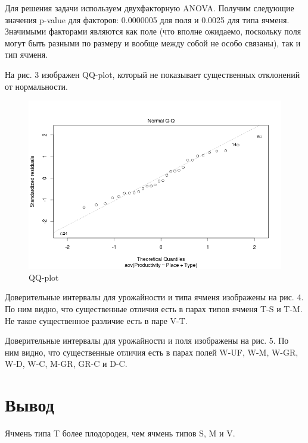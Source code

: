\documentclass[10pt]{article}
\begin{document}
Для решения задачи используем двухфакторную ANOVA.
Получим следующие значения p-value для факторов: 0.0000005 для поля и 0.0025 для типа ячменя.
Значимыми факторами являются как поле (что вполне ожидаемо, поскольку поля могут быть разными по размеру и вообще между собой не особо связаны), так и тип ячменя.

На рис. 3 изображен QQ-plot, который не показывает существенных отклонений от нормальности.

\begin{figure}[h]
  \centering
  \includegraphics[scale=0.4]{qqplot.png}
  \caption{QQ-plot}
\end{figure}

Доверительные интервалы для урожайности и типа ячменя изображены на рис. 4.
По ним видно, что существенные отличия есть в парах типов ячменя T-S и T-M.
Не такое существенное различие есть в паре V-T.

Доверительные интервалы для урожайности и поля изображены на рис. 5.
По ним видно, что существенные отличия есть в парах полей W-UF, W-M, W-GR, W-D, W-C, M-GR, GR-C и D-C.

\section{Вывод}

Ячмень типа T более плодороден, чем ячмень типов S, M и V.
\end{document}
